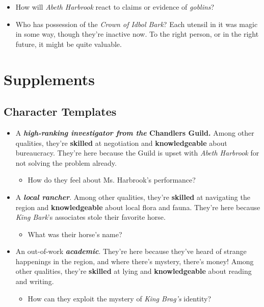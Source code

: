 \documentclass[11pt]{teraum_adventure}
\begin{document}
\begin{itemize}
\item How will \emph{Abeth Harbrook} react to claims or evidence of \emph{goblins}?
\item Who has possession of the \emph{Crown of Idbol Bark}? Each utensil in it
was magic in some way, though they're inactive now. To the right
person, or in the right future, it might be quite valuable.
\end{itemize}
\section*{Supplements}
\label{sec:orga07c8ef}
\subsection*{Character Templates}
\label{sec:org373f73d}
\begin{itemize}
\item A \textbf{\emph{high-ranking investigator from the} Chandlers Guild.} Among other qualities, they're \textbf{skilled} at negotiation and \textbf{knowledgeable} about bureaucracy. They're
here because the Guild is upset with \emph{Abeth Harbrook} for not solving
the problem already.
\begin{itemize}
\item How do they feel about Ms. Harbrook's performance?
\end{itemize}
\item A \textbf{\emph{local rancher}}. Among other qualities, they're \textbf{skilled} at navigating the region and \textbf{knowledgeable} about local flora and fauna. They're here
because \emph{King Bark}'s associates stole their favorite horse.
\begin{itemize}
\item What was their horse's name?
\end{itemize}
\item An out-of-work \textbf{\emph{academic}}.
They're here because they've heard of strange happenings in the region, and where there's mystery, there's money! Among other qualities, they're \textbf{skilled} at lying and \textbf{knowledgeable} about reading and writing.
\begin{itemize}
\item How can they exploit the mystery of \emph{King Brag's} identity?
\end{itemize}
\end{itemize}
\end{document}
